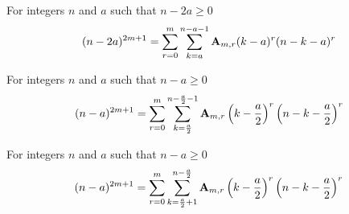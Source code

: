 \begin{corollary}
    \label{prop:shifted-negated-binomial-form}
    For integers $n$ and $a$ such that $n-2a \geq 0$
    \begin{align*}
    (n-2a)^{2m+1} = \sum_{r=0}^{m} \sum_{k=a}^{n-a-1} {\mathbf{A}} \sb{m,r} (k-a)^r (n-k-a)^r
    \end{align*}
\end{corollary}

\begin{corollary}
    \label{cor:centered-negated-binomial-form}
    For integers $n$ and $a$ such that $n-a \geq 0$
    \begin{align*}
    (n-a)^{2m+1} = \sum_{r=0}^{m} \sum_{k=\frac{a}{2}}^{n-\frac{a}{2}-1} {\mathbf{A}} \sb{m,r} \left( k-\frac{a}{2} \right)^r \left(n-k-\frac{a}{2} \right)^r
    \end{align*}
\end{corollary}

\begin{corollary}
    \label{cor:shifted-centered-negated-binomial-form}
    For integers $n$ and $a$ such that $n-a \geq 0$
    \begin{align*}
    (n-a)^{2m+1} = \sum_{r=0}^{m} \sum_{k=\frac{a}{2}+1}^{n-\frac{a}{2}} {\mathbf{A}} \sb{m,r} \left( k-\frac{a}{2} \right)^r \left(n-k-\frac{a}{2} \right)^r
    \end{align*}
\end{corollary}
